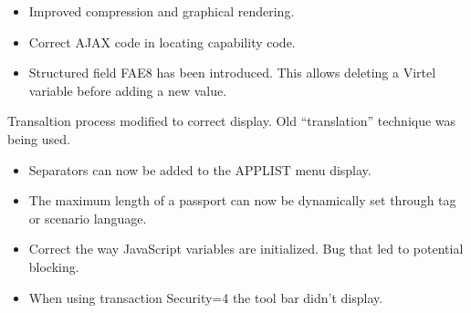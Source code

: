 \documentclass[letterpaper,10pt,english]{sphinxmanual}
\begin{document}
\begin{itemize}
\item {} 
Improved compression and graphical rendering.

\item {} 
Correct AJAX code in locating capability code.

\end{itemize}

\begin{itemize}
\item {} 
Structured field FAE8 has been introduced. This allows deleting a Virtel variable before adding a new value.

\end{itemize}


Transaltion process modified to correct display. Old “translation” technique was being used.

\begin{itemize}
\item {} 
Separators can now be added to the APPLIST menu display.

\end{itemize}

\begin{itemize}
\item {} 
The maximum length of a passport can now be dynamically set through tag or scenario language.

\end{itemize}

\begin{itemize}
\item {} 
Correct the way JavaScript variables are initialized. Bug that led to potential blocking.

\end{itemize}

\begin{itemize}
\item {} 
When using transaction Security=4 the tool bar didn’t display.

\end{itemize}
\end{document}
